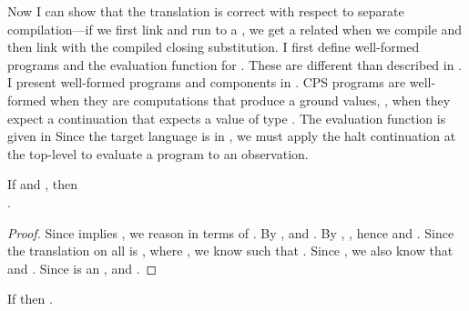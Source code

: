{\FigCPSProg
\FigCPSEval
Now I can show that the \cbnname{} translation is correct with respect to
separate compilation---if we first link and run to a , we get a related
 when we compile and then link with the compiled closing
substitution.
I first define well-formed programs and the evaluation function for \cpstlang.
These are different than described in .
I present well-formed programs and components in .
CPS programs are well-formed when they are computations that produce a ground
values, \ie, when they expect a continuation that expects a value of type
\im{\cpsboolty}.
The evaluation function is given in 
Since the target language is in , we must apply the halt continuation
\im{\cpsidk} at the top-level to evaluate a program to an observation.
\begin{theorem}
  \label{thm:cps:cbn:sep-comp}
  If \im{\wf{\slenv}{\se}} and
  \im{\ssubstok{\slenv}{\ssubst}},
  then\\%
  \im{\seval{\ssubst(\se)} \approx \teval{\ssubst^+(\se^\div)}}.
\end{theorem}
\begin{proof}
  Since  implies , we reason in terms of
  .
  By , \im{(\ssubst(\se))^\div \stepstar \cpse} and \im{\sv^\div
    \equiv \cpse}.
  By , \im{(\ssubst(\se))^\div \equiv
    \ssubst^{\div}(\se^\div)}, hence \im{\ssubst^{\div}(\se^\div) \stepstar \cpse} and
  \im{\sv^\div \equiv \cpse}.
  Since the translation on all  is \im{\sv^\div =
    \cpsnfune{\cpsalpha}{\cpsnfune{\cpsk}{\cpsappe{\cpsk}{\cpsv}}}}, where \im{\sv \approx \cpsv},
  we know \im{\cpsncappe{\sv^\div}{\sA^+}{\cpsidk} \stepstar \cpsv} such that \im{\sv \approx \cpsv}.
  Since \im{\sv^\div \equiv \cpse \equiv \ssubst^{\div}(\se^\div)}, we also know that
  \im{\cpsappe{\ssubst^{\div}(\se^\div)}{\sA^+\cpsidk} \stepstar \cpsvpr} and \im{\cpsvpr \equiv
    \cpsv}.
  Since \im{\cpsv} is an , \im{\cpsvpr = \cpsv} and \im{\sv \approx \cpsvpr}.
\end{proof}

\begin{corollary}
  \label{thm:cps:cbn:correctness}
  If \im{\wf{}{\se}} then
  \im{\seval{\se} \approx \teval{\se^\div}}.
\end{corollary}
}
